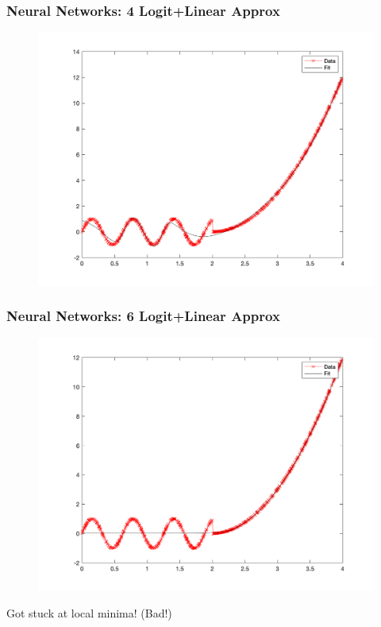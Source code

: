 \documentclass{beamer}
\begin{document}
\begin{frame}
\frametitle[alignment=center]{Neural Networks: 4 Logit+Linear Approx}
\begin{figure}
\includegraphics[scale=0.5]{NN_Example/Fig_Shallow_4.png}
\end{figure}
\end{frame}


\begin{frame}
\frametitle[alignment=center]{Neural Networks: 6 Logit+Linear Approx}
\begin{figure}
\includegraphics[scale=0.5]{NN_Example/Fig_Shallow_6.png}
\end{figure}
Got stuck at local minima!  (Bad!)
\end{frame}
\end{document}
